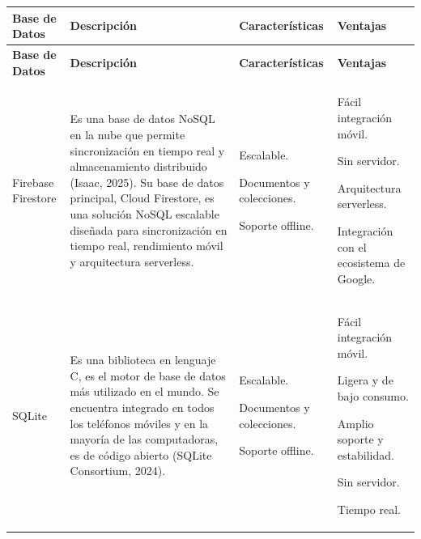 {\small
\begin{longtable}{|L{2.1cm}|L{5.45cm}|L{3.5cm}|L{3.2cm}|}
\hline
{} \textbf{Base de Datos} & \textbf{Descripción} & \textbf{Características} &
\textbf{Ventajas} \\
\hline
\endfirsthead
\hline
{} \textbf{Base de Datos} & \textbf{Descripción} & \textbf{Características} &
\textbf{Ventajas} \\
\hline
\endhead

\endfoot
Firebase Firestore & Es una base de datos NoSQL en la nube que permite
sincronización en tiempo real y almacenamiento distribuido (Isaac, 2025). Su
base de datos principal, Cloud Firestore, es una solución NoSQL escalable
diseñada para sincronización en tiempo real, rendimiento móvil y arquitectura
serverless. &
\begin{tablista}
  \item Escalable.
  \item Documentos y colecciones.
  \item Soporte offline.
\end{tablista} &
\begin{tablista}
  \item Fácil integración móvil.
  \item Sin servidor.
  \item Arquitectura serverless.
  \item Integración con el ecosistema de Google.
\end{tablista} \\
\hline
SQLite & Es una biblioteca en lenguaje C, es el motor de base de datos más
utilizado en el mundo. Se encuentra integrado en todos los teléfonos móviles y
en la mayoría de las computadoras, es de código abierto (SQLite Consortium,
2024). &
\begin{tablista}
  \item Escalable.
  \item Documentos y colecciones.
  \item Soporte offline.
\end{tablista} &
\begin{tablista}
  \item Fácil integración móvil.
  \item Ligera y de bajo consumo.
  \item Amplio soporte y estabilidad.
  \item Sin servidor.
  \item Tiempo real.
\end{tablista} \\

\end{longtable}}
